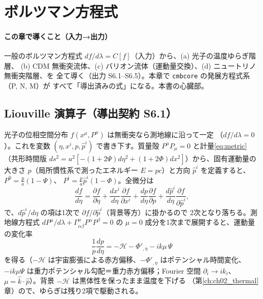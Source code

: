 \section{ボルツマン方程式}
\label{ch:ch06_boltzmann}

\paragraph{この章で導くこと（入力→出力）}
一般のボルツマン方程式 $df/d\lambda=C[f]$（入力）から、(a) 光子の温度ゆらぎ階層、
(b) CDM 無衝突流体、(c) バリオン流体（運動量交換）、(d) ニュートリノ無衝突階層、を
全て導く（出力 S6.1--S6.5）。本章で \texttt{cmbcore} の発展方程式系（P, N, M）が
すべて「導出済みの式」になる。本書の心臓部。

\subsection{Liouville 演算子（導出契約 S6.1）}
光子の位相空間分布 $f(x^\mu,P^\mu)$ は無衝突なら測地線に沿って一定
（$df/d\lambda=0$）。これを変数 $(\eta,x^i,p,\hat p^i)$ で書き下す。質量殻
$P^\mu P_\mu=0$ と計量\eqref{eq:metric}（共形時間版 $ds^2=a^2[-(1+2\Psi)d\eta^2+
(1+2\Phi)dx^2]$）から、固有運動量の大きさ $p$（局所慣性系で測ったエネルギー
$E=pc$）と方向 $\hat p^i$ を定義すると、$P^0=\frac{p}{a}(1-\Psi)$、
$P^i=\frac{p}{a}\hat p^i(1-\Phi)$。全微分は
\begin{equation}
  \frac{df}{d\eta}=\frac{\partial f}{\partial\eta}
  +\frac{dx^i}{d\eta}\frac{\partial f}{\partial x^i}
  +\frac{dp}{d\eta}\frac{\partial f}{\partial p}
  +\frac{d\hat p^i}{d\eta}\frac{\partial f}{\partial\hat p^i},
\end{equation}
で、$d\hat p^i/d\eta$ の項は1次で $\partial f/\partial\hat p^i$（背景等方）に掛かるので
2次となり落ちる。測地線方程式 $dP^\mu/d\lambda+\Gamma^\mu_{\alpha\beta}P^\alpha P^\beta=0$
の $\mu=0$ 成分を1次まで展開すると、運動量の変化率
\begin{equation}
  \frac{1}{p}\frac{dp}{d\eta}=-\mathcal H-\Phi'_{,\eta}-ik\mu\,\Psi
  \label{eq:dpdeta}
\end{equation}
を得る（$-\mathcal H$ は宇宙膨張による赤方偏移、$-\Phi'_{,\eta}$ はポテンシャル時間変化、
$-ik\mu\Psi$ は重力ポテンシャル勾配＝重力赤方偏移；Fourier 空間 $\partial_i\to ik_i$、
$\mu=\hat k\cdot\hat p$）。背景 $-\mathcal H$ は黒体性を保ったまま温度を下げる
（第\ref{ch:ch02_thermal}章）ので、ゆらぎは残り2項で駆動される。


